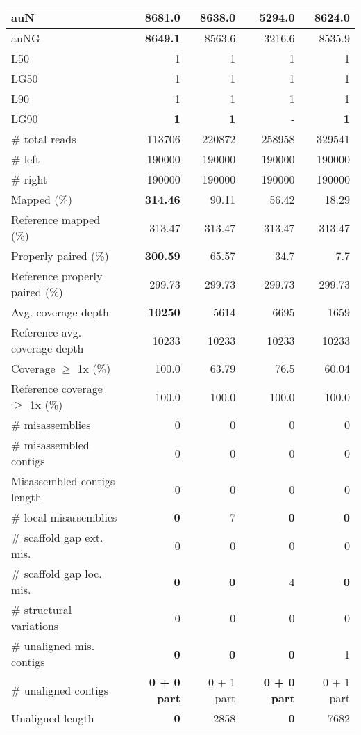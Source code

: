 \documentclass[12pt,a4paper]{article}
\begin{document}
\begin{table}[ht]
\begin{center}
\begin{tabular}{|l*{4}{|r}|}
auN & {\bf 8681.0} & 8638.0 & 5294.0 & 8624.0 \\ \hline
auNG & {\bf 8649.1} & 8563.6 & 3216.6 & 8535.9 \\ \hline
L50 & 1 & 1 & 1 & 1 \\ \hline
LG50 & 1 & 1 & 1 & 1 \\ \hline
L90 & 1 & 1 & 1 & 1 \\ \hline
LG90 & {\bf 1} & {\bf 1} & - & {\bf 1} \\ \hline
\# total reads & 113706 & 220872 & 258958 & 329541 \\ \hline
\# left & 190000 & 190000 & 190000 & 190000 \\ \hline
\# right & 190000 & 190000 & 190000 & 190000 \\ \hline
Mapped (\%) & {\bf 314.46} & 90.11 & 56.42 & 18.29 \\ \hline
Reference mapped (\%) & 313.47 & 313.47 & 313.47 & 313.47 \\ \hline
Properly paired (\%) & {\bf 300.59} & 65.57 & 34.7 & 7.7 \\ \hline
Reference properly paired (\%) & 299.73 & 299.73 & 299.73 & 299.73 \\ \hline
Avg. coverage depth & {\bf 10250} & 5614 & 6695 & 1659 \\ \hline
Reference avg. coverage depth & 10233 & 10233 & 10233 & 10233 \\ \hline
Coverage $\geq$ 1x (\%) & 100.0 & 63.79 & 76.5 & 60.04 \\ \hline
Reference coverage $\geq$ 1x (\%) & 100.0 & 100.0 & 100.0 & 100.0 \\ \hline
\# misassemblies & 0 & 0 & 0 & 0 \\ \hline
\# misassembled contigs & 0 & 0 & 0 & 0 \\ \hline
Misassembled contigs length & 0 & 0 & 0 & 0 \\ \hline
\# local misassemblies & {\bf 0} & 7 & {\bf 0} & {\bf 0} \\ \hline
\# scaffold gap ext. mis. & 0 & 0 & 0 & 0 \\ \hline
\# scaffold gap loc. mis. & {\bf 0} & {\bf 0} & 4 & {\bf 0} \\ \hline
\# structural variations & 0 & 0 & 0 & 0 \\ \hline
\# unaligned mis. contigs & {\bf 0} & {\bf 0} & {\bf 0} & 1 \\ \hline
\# unaligned contigs & {\bf 0 + 0 part} & 0 + 1 part & {\bf 0 + 0 part} & 0 + 1 part \\ \hline
Unaligned length & {\bf 0} & 2858 & {\bf 0} & 7682 \\ \hline

\end{tabular}
\end{center}
\end{table}
\end{document}

